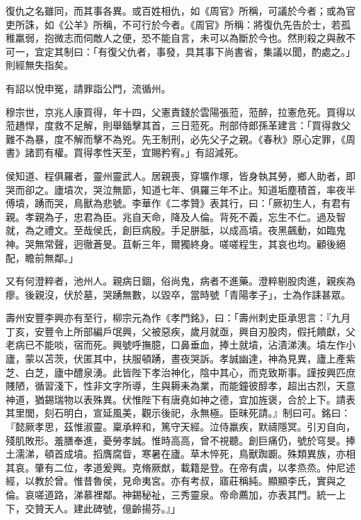 \begin{pinyinscope}
 復仇之名雖同，而其事各異。或百姓相仇，如《周官》所稱，可議於今者；或為官吏所誅，如《公羊》所稱，不可行於今者。《周官》所稱：將復仇先告於士，若孤稚羸弱，抱微志而伺敵人之便，恐不能自言，未可以為斷於今也。然則殺之與赦不可一，宜定其制曰：「有復父仇者，事發，具其事下尚書省，集議以聞，酌處之。」則經無失指矣。



 有詔以悅申冤，請罪詣公門，流循州。



 穆宗世，京兆人康買得，年十四，父憲責錢於雲陽張蒞，蒞醉，拉憲危死。買得以蒞趫悍，度救不足解，則舉鍤擊其首，三日蒞死。刑部侍郎孫革建言：「買得救父難不為暴，度不解而擊不為兇。先王制刑，必先父子之親。《春秋》原心定罪，《周書》諸罰有權。買得孝性天至，宜賜矜宥。」有詔減死。



 侯知道、程俱羅者，靈州靈武人。居親喪，穿壙作塚，皆身執其勞，鄉人助者，即哭而卻之。廬墳次，哭泣無節，知道七年、俱羅三年不止。知道垢塵積首，率夜半傅墳，踴而哭，鳥獸為悲號。李華作《二孝贊》表其行，曰：「厥初生人，有君有親。孝親為子，忠君為臣。兆自天命，降及人倫。背死不義，忘生不仁。過及智就，為之禮文。至哉侯氏，創巨病殷。手足胼胝，以成高墳。夜黑飆動，如臨鬼神。哭無常聲，迥徹蒼旻。苴斬三年，爾獨終身。嗟嗟程生，其哀也均。顧後絕配，瞻前無鄰。」



 又有何澄粹者，池州人。親病日錮，俗尚鬼，病者不進藥。澄粹剔股肉進，親疾為瘳。後親沒，伏於墓，哭踴無數，以毀卒，當時號「青陽孝子」，士為作誄甚眾。



 壽州安豐李興亦有至行，柳宗元為作《孝門銘》，曰：「壽州刺史臣承思言：『九月丁亥，安豐令上所部編戶氓興，父被惡疾，歲月就亟，興自刃股肉，假托饋獻，父老病已不能啖，宿而死。興號呼撫臆，口鼻垂血，捧土就墳，沾漬涕洟。墳左作小廬，蒙以苫茨，伏匿其中，扶服頓踴，晝夜哭訴。孝誠幽達，神為見異，廬上產紫芝、白芝，廬中醴泉湧。此皆陛下孝治神化，陰中其心，而克致斯事。謹按興匹庶賤陋，循習淺下，性非文字所導，生與耨耒為業，而能鐘彼醇孝，超出古烈，天意神道，猶錫瑞物以表殊異。伏惟陛下有唐堯如神之德，宜加旌褒，合於上下。請表其里閭，刻石明白，宣延風美，觀示後祀，永無極。臣昧死請。』制曰可。銘曰：『懿厥孝思，茲惟淑靈。稟承粹和，篤守天經。泣侍羸疾，默禱隱冥。引刃自向，殘肌敗形。羞膳奉進，憂勞孝誠。惟時高高，曾不視聽。創巨痛仍，號於穹旻。捧土濡涕，頓首成墳。搯膺腐眥，寒暑在廬。草木悴死，鳥獸踟躕。殊類異族，亦相其哀。肇有二位，孝道爰興。克脩厥猷，載籍是登。在帝有虞，以孝烝烝。仲尼述經，以教於曾。惟昔魯侯，見命夷宮。亦有考叔，寤莊稱純。顯顯李氏，實與之倫。哀嗟道路，涕慕裡鄰。神錫秘祉，三秀靈泉。帝命薦加，亦表其門。統一上下，交贊天人。建此碑號，億齡揚芬。』」




\end{pinyinscope}
